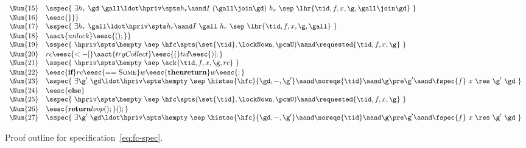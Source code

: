 \begin{figure}[t!]
\[{\begin{array}{r@{\ \ \ }l@{\ }l}
  \Num{15} & \sspec{~
     \exists h_r~\gd~\gall\ldot \hpriv \spts h_r  \aand
    I~(\gall \join \gd)~h_r ~\sep~
    \lhr{\tid, f, x, \g, \gall \join \gd}~} & 
  \\[1pt] 
  \Num{16} &  \eesc{\}\}}        & 
  \\
  \Num{17} &   \sspec{~\exists h_r~\gall\ldot \hpriv \spts h_r  \aand I~\gall~h_r 
    ~\sep~ \lhr{\tid, f, x, \g, \gall}~} & 
  \\[1.5pt]
  \Num{18} &  \aact{unlock}\eesc{();\}}        & 
  \\
  \Num{19} & \sspec{~\hpriv \spts \hempty ~\sep~
    \hfc \spts (\set{\tid}, \lockNown, \pcmU) \aand \requested{\tid, f, x, \g} ~} & 
  \\[1.5pt]
  \Num{20} &  rc\eesc{ <- [}\aact{tryCollect} \eesc{(}tid\eesc{)];}        & 
  \\
  \Num{21} & \sspec{~\hpriv \spts \hempty ~\sep~ 
    \ack{\tid, f, x, \g, {rc}} ~} & 
  \\[1.5pt]
  \Num{22} &  \eesc{\textbf{if} }rc\eesc{ == \textsc{Some} }w\eesc{
    \textbf{then} \textbf{return} } w\eesc{;}        & 
  \\
  \Num{23} & \sspec{~
     \exists \g'~\gd\ldot \hpriv \spts \hempty ~\sep~
     \histso{\hfc}{\gd, -, \g'} \aand \noreqs{\tid} \aand 
     \g \pre \g' \aand
     \fspec{f}~x~\res~\g'~\gd 
   ~} &
  \\[1.5pt]
  \Num{24} &  \eesc{\textbf{else}}        & 
  \\
  \Num{25} & \sspec{~\hpriv \spts \hempty ~\sep~
    \hfc \spts (\set{\tid}, \lockNown, \pcmU) \aand \requested{\tid, f, x, \g} ~} & 
  \\[1.5pt]
  \Num{26} &  \eesc{\textbf{return} loop();\}();}        & 
  \\
  \Num{27} & \sspec{~
     \exists \g'~\gd\ldot \hpriv \spts \hempty ~\sep~
     \histso{\hfc}{\gd, -, \g'} \aand \noreqs{\tid} \aand 
     \g \pre \g' \aand
     \fspec{f}~x~\res~\g'~\gd 
   ~} & 
\end{array}
}
\]
%
\caption{Proof outline for  specification~\eqref{eq:fc-spec}.}
\label{fig:flatco-proof}
\end{figure}

